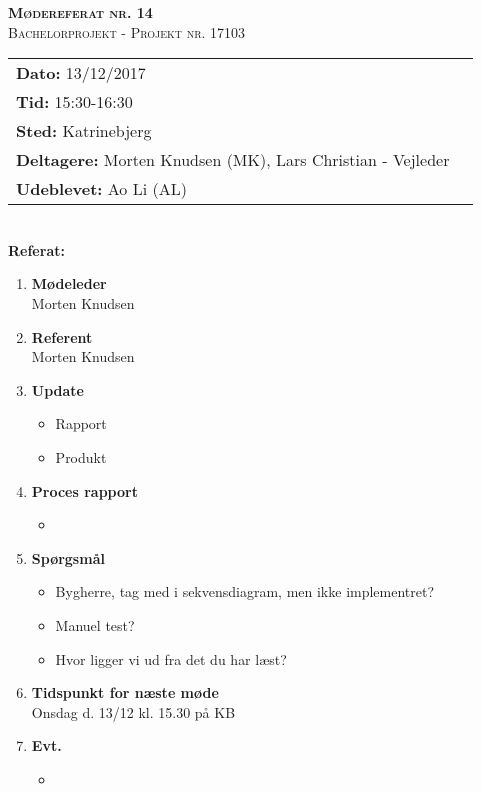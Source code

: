 
\newcommand{\HRule}{\rule{\linewidth}{0.1mm}}


	\begin{center}
		{\huge \bfseries \textsc{Mødereferat nr. 14}}\\
		\textsc{\large Bachelorprojekt - Projekt nr. 17103}\\[0.3cm]
	\end{center}
	\begin{tabular}{ll}
	\large \textbf{Dato:} 13/12/2017  	\\ %
	\large \textbf{Tid:}  15:30-16:30 	\\ %
	\large \textbf{Sted:} Katrinebjerg		\\ %
	\large \textbf{Deltagere:} Morten Knudsen (MK), Lars Christian - Vejleder \\
	\large \textbf{Udeblevet:} Ao Li (AL)
	\end{tabular}\\
	\phantom{\,}\hspace{0.1em} \large \textbf{Referat:}
	\begin{enumerate}
		\itemsep 0.3em 
		\item \textbf{Mødeleder}\\
			Morten Knudsen
		\item \textbf{Referent}\\
			Morten Knudsen

		\item \textbf{Update}
			\begin{itemize}[-]
				\item Rapport 
				\item Produkt
								
			\end{itemize}
		
		\item \textbf{Proces rapport}
		\begin{itemize}[-]
			\item 
		\end{itemize}
			
		\item \textbf{Spørgsmål}
			\begin{itemize}[-]
				\item Bygherre, tag med i sekvensdiagram, men ikke implementret?
				\item Manuel test?
				\item Hvor ligger vi ud fra det du har læst?		
			\end{itemize}
	
		\item \textbf{Tidspunkt for næste møde} \\
			Onsdag d. 13/12 kl. 15.30 på KB \\
						
		\item \textbf{Evt.}
			\begin{itemize}[-]
				\item 
			\end{itemize}
			
	\end{enumerate}
